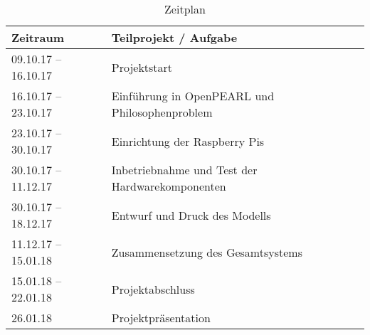 	\begin{table}[H]
		
		\begin{center}
			\renewcommand{\arraystretch}{1.2}
			\begin{tabular}{|p{5cm}|l|}
				\hline
				\textbf{Zeitraum} & \textbf{Teilprojekt / Aufgabe}\\
				\hline
				09.10.17 -- 16.10.17 & Projektstart\\
				\hline
				16.10.17 -- 23.10.17 & Einführung in OpenPEARL und Philosophenproblem\\
				\hline
				23.10.17 -- 30.10.17 & Einrichtung der Raspberry Pis\\
				\hline
				30.10.17 -- 11.12.17 & Inbetriebnahme und Test der Hardwarekomponenten\\
				\hline
				30.10.17 -- 18.12.17 & Entwurf und Druck des Modells\\
				\hline
				11.12.17 -- 15.01.18 & Zusammensetzung des Gesamtsystems\\
				\hline 
				15.01.18 -- 22.01.18 & Projektabschluss\\
				\hline
				26.01.18 & Projektpräsentation\\
				\hline
			\end{tabular}
		\end{center}
		\caption{Zeitplan}\label{tab:zeitplan}
	\end{table}
	